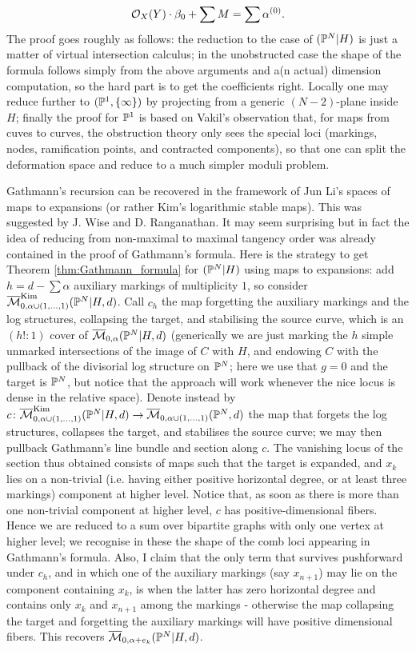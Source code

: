 \[\mathcal{O}_X(Y)\cdot\beta_0+\sum M=\sum \alpha^{(0)}.\]
The proof goes roughly as follows: the reduction to the case of $(\mathbb P^N|H)$ is just a matter of virtual intersection calculus; in the unobstructed case the shape of the formula follows simply from the above arguments and a(n actual) dimension computation, so the hard part is to get the coefficients right. Locally one may reduce further to $(\mathbb P^1,\{\infty\})$ by projecting from a generic $(N-2)$-plane inside $H$; finally the proof for $\mathbb P^1$ is based on Vakil's observation that, for maps from cuves to curves, the obstruction theory only sees the special loci (markings, nodes, ramification points, and contracted components), so that one can split the deformation space and reduce to a much simpler moduli problem.
\begin{rmk}\label{rmk:expandedGathmann}
 Gathmann's recursion can be recovered in the framework of Jun Li's spaces of maps to expansions (or rather Kim's logarithmic stable maps). This was suggested by J. Wise and D. Ranganathan. It may seem surprising but in fact the idea of reducing from non-maximal to maximal tangency order was already contained in the proof of Gathmann's formula. Here is the strategy to get Theorem \ref{thm:Gathmann_formula} for $(\mathbb P^N|H)$ using maps to expansions: add $h=d-\sum\alpha$ auxiliary markings of multiplicity $1$, so consider $\overline{\mathcal{M}}^{\rm{Kim}}_{0,\alpha\cup(1,\ldots,1)}(\mathbb P^N|H,d)$. Call $c_h$ the map forgetting the auxiliary markings and the log structures, collapsing the target, and stabilising the source curve, which is an $(h!:1)$ cover of $\overline{\mathcal{M}}_{0,\alpha}(\mathbb P^N|H,d)$ (generically we are just marking the $h$ simple unmarked intersections of the image of $C$ with $H$, and endowing $C$ with the pullback of the divisorial log structure on $\mathbb P^N$; here we use that $g=0$ and the target is $\mathbb P^N$, but notice that the approach will work whenever the nice locus is dense in the relative space). Denote instead by $c\colon \overline{\mathcal{M}}^{\rm{Kim}}_{0,\alpha\cup(1,\ldots,1)}(\mathbb P^N|H,d)\rightarrow \overline{\mathcal{M}}_{0,\alpha\cup(1,\ldots,1)}(\mathbb P^N,d)$ the map that forgets the log structures, collapses the target, and stabilises the source curve; we may then pullback Gathmann's line bundle and section along $c$. The vanishing locus of the section thus obtained consists of maps such that the target is expanded, and $x_k$ lies on a non-trivial (i.e. having either positive horizontal degree, or at least three markings) component at higher level. Notice that, as soon as there is more than one non-trivial component at higher level, $c$ has positive-dimensional fibers. Hence we are reduced to a sum over bipartite graphs with only one vertex at higher level; we recognise in these the shape of the comb loci appearing in Gathmann's formula. Also, I claim that the only term that survives pushforward under $c_h$, and in which one of the auxiliary markings (say $x_{n+1}$) may lie on the component containing $x_k$, is when the latter has zero horizontal degree and contains only $x_k$ and $x_{n+1}$ among the markings - otherwise the map collapsing the target and forgetting the auxiliary markings will have positive dimensional fibers. This recovers $\overline{\mathcal{M}}_{0,\alpha+e_k}(\mathbb P^N|H,d)$. 

\end{rmk}
